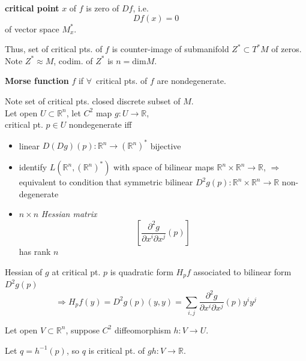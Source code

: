 \begin{definition}
  \textbf{critical point} $x$ of $f$ is zero of $Df$, i.e. \begin{equation}
Df(x) = 0 
  \end{equation} of vector space $M_x^*$.  
  \end{definition}

Thus, set of critical pts. of $f$ is counter-image of submanifold $Z^* \subset T^*M$ of zeros.  \\
Note $Z^*\approx M$, codim. of $Z^*$ is $n=\text{dim}M$.  

\begin{definition}
  \textbf{Morse function} $f$ if $\forall \, $ critical pts. of $f$ are nondegenerate.
  \end{definition}

Note set of critical pts. closed discrete subset of $M$.  \\
Let open $U \subset \mathbb{R}^n$, let $C^2$ map $g:U\to \mathbb{R}$, \\
critical pt. $p\in U$ nondegenerate iff
\begin{itemize}
\item linear $D(Dg)(p):\mathbb{R}^n \to (\mathbb{R}^n)^*$ bijective
\item identify $L(\mathbb{R}^n, (\mathbb{R}^n)^*)$ with space of bilinear maps $\mathbb{R}^n \times \mathbb{R}^n \to \mathbb{R}$, $\Longrightarrow$ equivalent to condition that symmetric bilinear $D^2g(p) : \mathbb{R}^n \times \mathbb{R}^n \to \mathbb{R}$ non-degenerate 
\item $n\times n$ \emph{Hessian matrix}
  \[
\left[ \frac{ \partial^2 g}{ \partial x^i  \partial x^j }(p) \right]
\]
has rank $n$
\end{itemize}

Hessian of $g$ at critical pt. $p$ is quadratic form $H_pf$ associated to bilinear form $D^2g(p)$
\[
\Longrightarrow H_pf(y) =D^2g(p)(y,y) = \sum_{i,j} \frac{ \partial^2g}{ \partial x^i \partial x^j}(p)y^i y^j
\]

Let open $V \subset \mathbb{R}^n$, suppose $C^2$ diffeomorphism $h: V\to U$.

Let $q=h^{-1}(p)$, so $q$ is critical pt. of $gh:V\to \mathbb{R}$.


